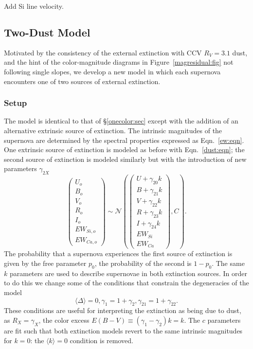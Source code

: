\documentclass[11pt, oneside]{article}   	%
\begin{document}
Add Si line velocity.

\subsection{Two-Dust Model}

Motivated by the consistency of the external extinction with CCV $R_V=3.1$ dust, and the hint of the color-magnitude
diagrams in Figure~\ref{magresidual:fig}  not following single slopes, we develop a new model in which
each supernova encounters one of two sources of external extinction.

\subsubsection{Setup}
The model is identical to that of \S\ref{onecolor:sec} except with the addition of an alternative extrinsic source of extinction.
The intrinsic magnitudes of the supernova are determined by the spectral properties expressed as Eqn.~\ref{ew:eqn}.
One extrinsic source of extinction is modeled as before with Eqn.~\ref{dust:eqn};
the second source of extinction
is modeled similarly but with the introduction of new parameters $\gamma_{2X}$
\begin{equation}
\left(
\begin{matrix}
U_o\\B_o\\ V_o\\R_o\\I_o\\EW_{Si, o}\\ EW_{Ca, o}\end{matrix}
\right) \sim \mathcal{N}
\left(
\left(
\begin{matrix}
U +\gamma_{20} k \\B +\gamma_{21} k \\V+\gamma_{22} k\\R+\gamma_{23} k\\I+\gamma_{24} k\\
EW_{Si}\\ EW_{Ca}
\end{matrix}
\right)
,C
\right).
\label{dust2:eqn}
\end{equation}
The probability that a supernova experiences the first source of extinction is given by the free parameter $p_0$,
the probability of the second is $1-p_0$.  
The same $k$ parameters are used to describe supernovae in both extinction sources.  In order to do this we change
some of the conditions that constrain the degeneracies of the model
\begin{equation*}
\langle \Delta \rangle=0, \gamma_1 = 1+\gamma_2, \gamma_{21}=1+\gamma_{22}.
\end{equation*}
These conditions are useful for interpreting the extinction as being due to dust, as $R_X = \gamma_X$,
the color excess $E(B-V) \equiv (\gamma_1-\gamma_2)k =k$.
The $c$ parameters  are fit such that both extinction models
revert to the same intrinsic magnitudes for $k=0$: the $\langle k \rangle=0$ condition is removed. 
\end{document}

